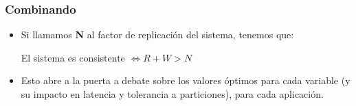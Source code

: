 \begin{frame}
\frametitle{Combinando}
\begin{itemize}
\item	Si llamamos \textbf{N} al factor de replicación del sistema,
	tenemos que:

	El sistema es consistente $ \iff R + W > N$
	\pause

\item	Esto abre a la puerta a debate sobre los valores óptimos
	para cada variable (y su impacto en latencia y tolerancia
	a particiones), para cada aplicación.
\end{itemize}
\end{frame}
